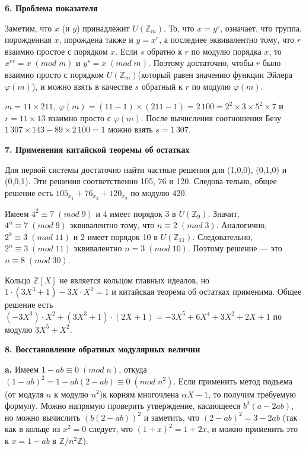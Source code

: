 \documentclass{mai_book}
\begin{document}
\noindent\textbf{6. Проблема показателя}

\medskip
Заметим, что $x$ (и $y$) принадлежит $U(\mathbb{Z}_m)$. То, что $x=y^s$, означает, что группа, порожденная $x$, порождена также и $y=x^r$, а последнее эквивалентно тому, что $r$ взаимно простое с порядком $x$. 
Если $s$ обрат­но к $r$ по модулю порядка $x$, то $x^{rs}=x\; (mod\; m)$ и $y^s=x\;(mod\; m)$.
Поэтому достаточно, чтобы $r$ было взаимно просто с порядком $U(\mathbb{Z}_m)$(который равен значению функции Эйлера $\varphi (m)$), и можно взять в ка­честве $s$ обратный к $r$ по модулю $\varphi (m)$.

$m=11\times 211,\; \varphi (m)=(11-1)\times (211-1)=2\,100=2^2\times 3\times 5^2\times 7$ и $r=11\times 13$ взаимно просто с $\varphi (m)$. После вычисления соотношения Безу $1\,307\times 143-89\times 2\,100=1$ можно взять $s=1\,307$.

\bigskip
\noindent\textbf{7. Применения китайской теоремы об остатках}
 
\medskip
Для первой системы достаточно найти частные решения для (1,0,0),
(0,1,0) и (0,0,1). Эти решения соответственно 105, 76 и 120. Следова­
тельно, общее решение есть $105_{x_1}+76_{x_2}+120_{x_3}$ по модулю 420.

Имеем $4^2\equiv 7\;(mod\;9)$ и 4 имеет порядок 3 в $U(\mathbb{Z}_9)$. Значит, $4^n\equiv 7\; (mod\;9)$ эквивалентно тому, что $n\equiv 2\; (mod\;3)$. Аналогично, $2^8\equiv 3\;(mod\; 11)$ и 2 имеет порядок 10 в $U(\mathbb{Z}_{11})$. 
Следовательно, $2^n\equiv 3\; (mod\; 11)$ эквивалентно $n=3\;(mod\; 10)$. Поэтому решение --- это $n\equiv 8\; (mod\; 30)$.

Кольцо $\mathbb{Z}[X]$ не является кольцом главных идеалов, но $1\cdot (3X^3+1)-3X\cdot X^2=1$ и китайская теорема об остатках применима. 
Общее реше­ние есть $(-3X^3)\cdot X^2+(3X^3+1)\cdot (2X+1)=-3X^5+6X^4+3X^2+2X+1$ по модулю $3X^5+X^2$.

\bigskip
\noindent\textbf{8. Восстановление обратных модулярных величин}

\medskip
\textbf{a.} Имеем $1-ab\equiv0\; (mod\;n)$, откуда $(1-ab)^2=1-ab(2-ab)\equiv 0\;(mod\; n^2)$. 
Если применить метод подъема (от модуля $n$ к модулю $n^2$)к корням многочлена $\alpha X-1$, то получим требуемую формулу. Можно напрямую проверить утверждение, касающееся $b^2(a-2ab)$, но можно
вычислить $(b(2-ab))^2$ и заметить, что $(2-ab)^2=3-2ab$ (так как в
кольце из $x^2=0$ следует, что $(1+x)^2=1+2x$, и можно применить это
к $x=1-ab$ в $\mathbb{Z}/n^2\mathbb{Z}$).
\end{document}
